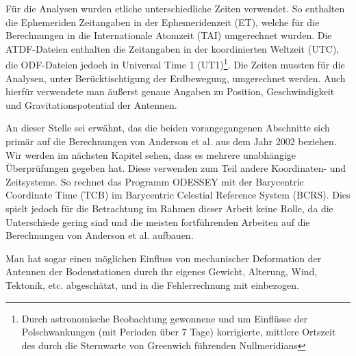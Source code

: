Für die Analysen wurden etliche unterschiedliche Zeiten verwendet. So enthalten die Ephemeriden Zeitangaben in der Ephemeridenzeit (ET),
welche für die Berechnungen in die Internationale Atomzeit (TAI) umgerechnet wurden. Die ATDF-Dateien enthalten die Zeitangaben in der koordinierten Weltzeit (UTC),
die ODF-Dateien jedoch in Universal Time 1 (UT1)\footnote{Durch astronomische Beobachtung gewonnene und um Einflüsse der Polschwankungen (mit Perioden über 7 Tage) korrigierte, mittlere Ortszeit des durch die Sternwarte von Greenwich führenden Nullmeridians}. Die Zeiten mussten für die Analysen, unter Berücktischtigung der Erdbewegung, umgerechnet werden.
Auch hierfür verwendete man äußerst genaue Angaben zu Position, Geschwindigkeit und Gravitationspotential der Antennen.\cite{Dittus2006}\cite{Anderson2002}\cite{Markwardt2002}

An dieser Stelle sei erwähnt, das die beiden vorangegangenen Abschnitte sich primär auf die Berechnungen von Anderson et al. aus dem Jahr 2002 beziehen.
Wir werden im nächsten Kapitel sehen, dass es mehrere unabhängige Überprüfungen gegeben hat.
Diese verwenden zum Teil andere Koordinaten- und Zeitsysteme.
So rechnet das Programm ODESSEY mit der Barycentric Coordinate Time (TCB) im Barycentric Celestial Reference System (BCRS).
Dies spielt jedoch für die Betrachtung im Rahmen dieser Arbeit keine Rolle, da die Unterschiede gering sind und die meisten fortführenden Arbeiten auf die Berechnungen von Anderson et al. aufbauen.	%

Man hat sogar einen möglichen Einfluss von mechanischer Deformation der Antennen der Bodenstationen durch ihr eigenes Gewicht,
Alterung, Wind, Tektonik, etc. abgeschätzt, und in die Fehlerrechnung mit einbezogen\cite{Dittus2006}. %



